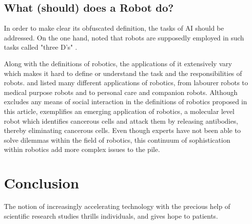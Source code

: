 \documentclass[man]{apa6}
\begin{document}
\subsection{What (should) does a Robot do?}
In order to make clear its obfuscated definition, the tasks of AI should be addressed.
 On the one hand,   noted that robots are supposedly employed in such tasks called "three D's" .
\par 
\par
Along with the definitions of robotics, the applications of it extensively vary which makes it hard to define or understand the task and the responsibilities of robots.
 and  listed many different applications of robotics, from labourer robots to medical purpose robots and to personal care and companion robots.
Although  excludes any means of social interaction in the definitions of robotics proposed in this article,  exemplifies an emerging application of robotics, a molecular level robot which identifies cancerous cells and attack them by releasing antibodies, thereby eliminating cancerous cells.
Even though experts have not been able to solve dilemmas within the field of robotics, this continuum of sophistication within robotics add more complex issues to the pile.

\par

\section{Conclusion}
The notion of increasingly accelerating technology with the precious help of scientific research studies thrills individuals, and gives hope to patients.

\end{document}
